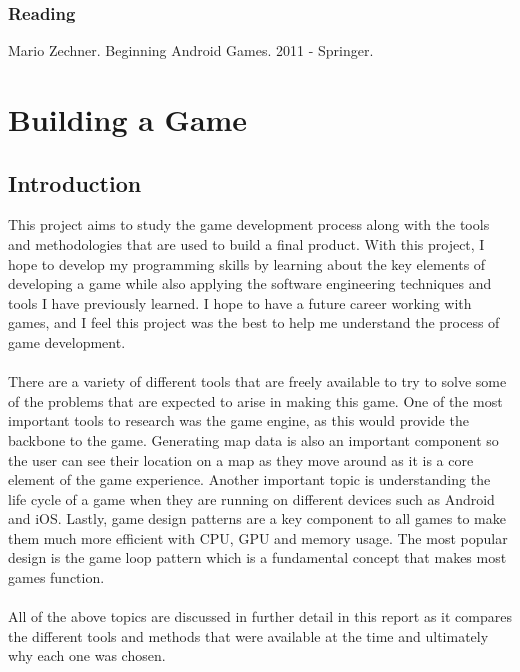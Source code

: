 \documentclass[a4paper]{report}
\begin{document}
\subsection*{Reading}
Mario Zechner. Beginning Android Games. 2011 - Springer.
\newpage
\chapter{Building a Game}
\section{Introduction}
This project aims to study the game development process along with the tools and methodologies that are used to build a final product. With this project, I hope to develop my programming skills by learning about the key elements of developing a game while also applying the software engineering techniques and tools I have previously learned. I hope to have a future career working with games, and I feel this project was the best to help me understand the process of game development.
\\\\
There are a variety of different tools that are freely available to try to solve some of the problems that are expected to arise in making this game. One of the most important tools to research was the game engine, as this would provide the backbone to the game. Generating map data is also an important component so the user can see their location on a map as they move around as it is a core element of the game experience. Another important topic is understanding the life cycle of a game when they are running on different devices such as Android and iOS. Lastly, game design patterns are a key component to all games to make them much more efficient with CPU, GPU and memory usage. The most popular design is the game loop pattern which is a fundamental concept that makes most games function.
\\\\
All of the above topics are discussed in further detail in this report as it compares the different tools and methods that were available at the time and ultimately why each one was chosen.  
\end{document}
